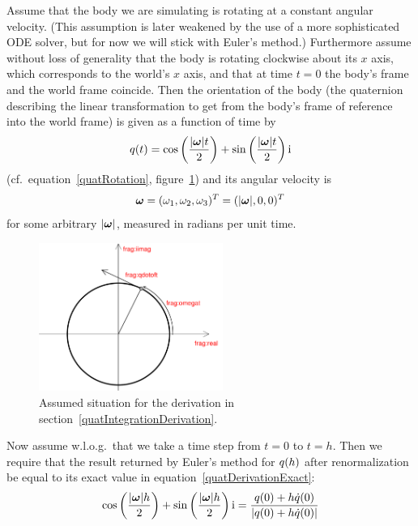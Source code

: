 Assume that the body we are simulating is rotating at a constant angular velocity.
(This assumption is later weakened by the use of a more sophisticated ODE solver,
but for now we will stick with Euler's method.) Furthermore assume without loss of
generality that the body is rotating clockwise about its $x$ axis, which corresponds
to the world's $x$ axis, and that at time $t=0$ the body's frame and the world frame
coincide. Then the orientation of the body (the quaternion describing
the linear transformation to get from the body's frame of reference into the world
frame) is given as a function of time by
\begin{equation}
\label{quatDerivationExact}
\q{q}(t) = \cos\left(\frac{\norm{\ve{\omega}}t}{2}\right) +
    \sin\left(\frac{\norm{\ve{\omega}}t}{2}\right)\qi
\end{equation}
(cf.\ equation~\ref{quatRotation}, figure~\ref{quatIntFig1}) and its angular velocity is
\begin{equation}
\ve{\omega} = (\omega_1, \omega_2, \omega_3)^T = (\norm{\ve{\omega}}, 0, 0)^T
\end{equation}
for some arbitrary $\norm{\ve{\omega}}$, measured in radians per unit time.

\begin{figure}
\centerline{\includegraphics[width=6cm]{figures/quaternion2}}
\caption{Assumed situation for the derivation in
section~\ref{quatIntegrationDerivation}.\label{quatIntFig1}}
\end{figure}

Now assume w.l.o.g.\ that we take a time step from $t = 0$ to $t = h$.
Then we require that the result returned by Euler's method for $q(h)$
after renormalization be equal to its exact value in equation~\ref{quatDerivationExact}:
\begin{equation}
\label{quatDerivationSetup}
\cos\left(\frac{\norm{\ve{\omega}} h}{2}\right) +
    \sin\left(\frac{\norm{\ve{\omega}} h}{2}\right)\qi =
    \frac{\q{q}(0) + h \dot{\q{q}}(0)}
        {\norm{\q{q}(0) + h \dot{\q{q}}(0)}}
\end{equation}

